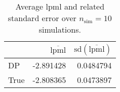\begin{table}[H]

\caption{Average lpml and related standard error over $n_{\text{sim}} = 10$ simulations.}
\centering
\begin{tabular}[t]{lrr}
\toprule
  & $\overbar{\text{lpml}}$ & $\text{sd}(\overbar{\text{lpml}})$\\
\midrule
DP & -2.891428 & 0.0484794\\
True & -2.808365 & 0.0473897\\
\bottomrule
\end{tabular}
\end{table}